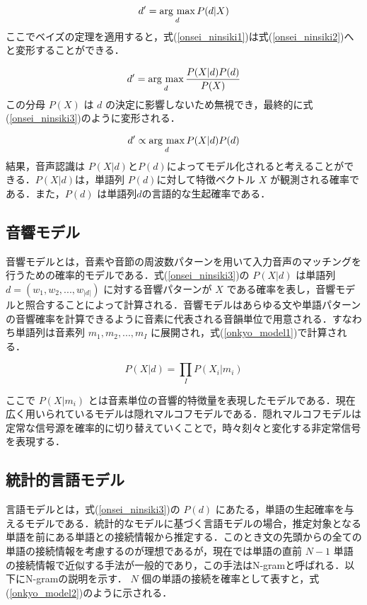 \begin{equation}
    d' = \mathop{\rm arg~max}\limits_{d} P(d|X) 
    \label{onsei_ninsiki1}
\end{equation}
ここでベイズの定理を適用すると，式(\ref{onsei_ninsiki1})は式(\ref{onsei_ninsiki2})へと変形することができる．

\begin{equation}
    d' = \mathop{\rm arg~max}\limits_{d}  \frac{P(X|d)P(d)}{P(X)} 
    \label{onsei_ninsiki2}
\end{equation}
この分母 $P(X)$ は $d$ の決定に影響しないため無視でき，最終的に式(\ref{onsei_ninsiki3})のように変形される．

\begin{equation}
    d' \propto \mathop{\rm arg~max}\limits_{d}  P(X|d)P(d) 
    \label{onsei_ninsiki3}
\end{equation}
結果，音声認識は $P(X|d)$と$P(d)$によってモデル化されると考えることができる．$P(X|d)$は，単語列 $P(d)$に対して特徴ベクトル $X$ が観測される確率である．また，$P(d)$ は単語列$d$の言語的な生起確率である．

\subsection{音響モデル}
音響モデルとは，音素や音節の周波数パターンを用いて入力音声のマッチングを行うための確率的モデルである．式(\ref{onsei_ninsiki3})の $P(X|d)$ は単語列 $d = (w_1, w_2, ..., w_{|d|})$ に対する音響パターンが $X$ である確率を表し，音響モデルと照合することによって計算される．音響モデルはあらゆる文や単語パターンの音響確率を計算できるように音素に代表される音韻単位で用意される．すなわち単語列は音素列 $m_1, m_2, ... , m_I $ に展開され，式(\ref{onkyo_model1})で計算される．

\begin{equation}
    P(X|d) = \prod_{I}  P(X_i|m_i) 
    \label{onkyo_model1}
\end{equation}

ここで $P(X|m_i)$ とは音素単位の音響的特徴量を表現したモデルである．現在広く用いられているモデルは隠れマルコフモデルである．隠れマルコフモデルは定常な信号源を確率的に切り替えていくことで，時々刻々と変化する非定常信号を表現する．

\subsection{統計的言語モデル}

言語モデルとは，式(\ref{onsei_ninsiki3})の $P(d)$ にあたる，単語の生起確率を与えるモデルである．統計的なモデルに基づく言語モデルの場合，推定対象となる単語を前にある単語との接続情報から推定する．このとき文の先頭からの全ての単語の接続情報を考慮するのが理想であるが，現在では単語の直前 $N-1$ 単語の接続情報で近似する手法が一般的であり，この手法はN-gramと呼ばれる．以下にN-gramの説明を示す． 
 $N$ 個の単語の接続を確率として表すと，式(\ref{onkyo_model2})のように示される．

